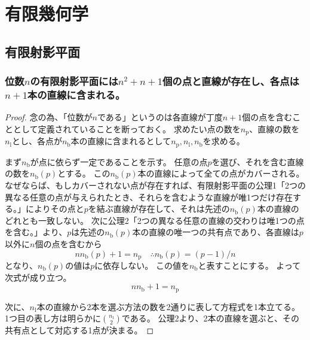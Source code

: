 \chapter{有限幾何学}
    \section{有限射影平面}
        \subsection{位数\texorpdfstring{$n$}{n}の有限射影平面には\texorpdfstring{$n^2+n+1$}{n\string^2+n+1}個の点と直線が存在し、各点は\texorpdfstring{$n+1$}{n+1}本の直線に含まれる。}
            \begin{proof}
                \newcommand{\np}{n_\textrm{p}}
                \newcommand{\nl}{n_\textrm{l}}
                \newcommand{\nb}{n_\textrm{b}}
                \quad\par
                念の為、「位数が$n$である」というのは各直線が丁度$n+1$個の点を含むこととして定義されていることを断っておく。
                求めたい点の数を$\np$、直線の数を$\nl$とし、各点が$\nb$本の直線に含まれるとして$\np,\nl,\nb$を求める。
                \par
                まず$\nb$が点に依らず一定であることを示す。
                任意の点$p$を選び、それを含む直線の数を$\nb(p)$とする。
                この$\nb(p)$本の直線によって全ての点がカバーされる。
                なぜならば、もしカバーされない点が存在すれば、有限射影平面の公理1「2つの異なる任意の点が与えられたとき、それらを含むような直線が唯1つだけ存在する。」によりその点と$p$を結ぶ直線が存在して、それは先述の$\nb(p)$本の直線のどれとも一致しない。
                次に公理2「2つの異なる任意の直線の交わりは唯1つの点を含む。」より、$p$は先述の$\nb(p)$本の直線の唯一つの共有点であり、各直線は$p$以外に$n$個の点を含むから
                \[ n \nb(p) + 1 = \np \quad \therefore \nb(p) = (p-1)/n \]
                となり、$\nb(p)$の値は$p$に依存しない。
                この値を$\nb$と表すことにする。
                よって次式が成り立つ。
                \begin{equation}
                    n \nb + 1= \np
                \end{equation}
                \par
                次に、$\nl$本の直線から2本を選ぶ方法の数を2通りに表して方程式を1本立てる。
                1つ目の表し方は明らかに$\binom{\nl}{2}$である。
                公理2より、2本の直線を選ぶと、その共有点として対応する1点が決まる。

\end{proof}
